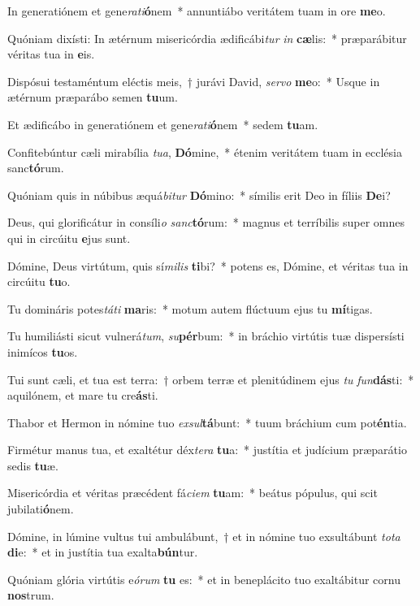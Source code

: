\item In generatiónem et gene\textit{ra}\textit{ti}\textbf{ó}nem~* annuntiábo veritátem tuam in ore \textbf{me}o.
\item Quóniam dixísti: In ætérnum misericórdia ædificábi\textit{tur} \textit{in} \textbf{cæ}lis:~* præparábitur véritas tua in \textbf{e}is.
\item Dispósui testaméntum eléctis meis,~† jurávi David, \textit{ser}\textit{vo} \textbf{me}o:~* Usque in ætérnum præparábo semen \textbf{tu}um.
\item Et ædificábo in generatiónem et gene\textit{ra}\textit{ti}\textbf{ó}nem~* sedem \textbf{tu}am.
\item Confitebúntur cæli mirabília \textit{tu}\textit{a}, \textbf{Dó}mine,~* étenim veritátem tuam in ecclésia sanc\textbf{tó}rum.
\item Quóniam quis in núbibus æquá\textit{bi}\textit{tur} \textbf{Dó}mino:~* símilis erit Deo in fíliis \textbf{De}i?
\item Deus, qui glorificátur in consíli\textit{o} \textit{sanc}\textbf{tó}rum:~* magnus et terríbilis super omnes qui in circúitu \textbf{e}jus sunt.
\item Dómine, Deus virtútum, quis sí\textit{mi}\textit{lis} \textbf{ti}bi?~* potens es, Dómine, et véritas tua in circúitu \textbf{tu}o.
\item Tu domináris potes\textit{tá}\textit{ti} \textbf{ma}ris:~* motum autem flúctuum ejus tu \textbf{mí}tigas.
\item Tu humiliásti sicut vulnerá\textit{tum}, \textit{su}\textbf{pér}bum:~* in bráchio virtútis tuæ dispersísti inimícos \textbf{tu}os.
\item Tui sunt cæli, et tua est terra:~† orbem terræ et plenitúdinem ejus \textit{tu} \textit{fun}\textbf{dás}ti:~* aquilónem, et mare tu cre\textbf{ás}ti.
\item Thabor et Hermon in nómine tuo \textit{ex}\textit{sul}\textbf{tá}bunt:~* tuum bráchium cum pot\textbf{én}tia.
\item Firmétur manus tua, et exaltétur déx\textit{te}\textit{ra} \textbf{tu}a:~* justítia et judícium præparátio sedis \textbf{tu}æ.
\item Misericórdia et véritas præcédent fá\textit{ci}\textit{em} \textbf{tu}am:~* beátus pópulus, qui scit jubilati\textbf{ó}nem.
\item Dómine, in lúmine vultus tui ambulábunt,~† et in nómine tuo exsultábunt \textit{to}\textit{ta} \textbf{di}e:~* et in justítia tua exalta\textbf{bún}tur.
\item Quóniam glória virtútis e\textit{ó}\textit{rum} \textbf{tu} es:~* et in beneplácito tuo exaltábitur cornu \textbf{nos}trum.
